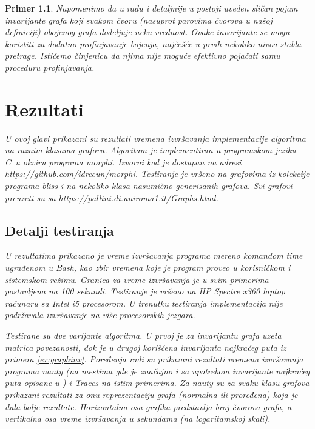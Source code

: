 \documentclass[12pt,oneside]{memoir}
\newtheorem{example}{Primer}
\theoremstyle{definition}
\def\CC{{C\nolinebreak[4]\hspace{-.05em}\raisebox{.4ex}{\tiny\bf ++}}}
\begin{document}
\begin{example}
   Napomenimo da u radu \cite{McKay} i detaljnije u \cite{nug} postoji uveden
   sličan pojam invarijante grafa koji svakom čvoru (nasuprot parovima čvorova
   u našoj definiciji) obojenog grafa dodeljuje neku vrednost. Ovake
   invarijante se mogu koristiti za dodatno profinjavanje bojenja, najčešće u
   prvih nekoliko nivoa stabla pretrage. Ističemo činjenicu da njima nije
   moguće efektivno pojačati samu proceduru profinjavanja.

\chapter{Rezultati}

  U ovoj glavi prikazani su rezultati vremena izvršavanja implementacije
  algoritma na raznim klasama grafova. Algoritam je implementiran u programskom
  jeziku \CC\ u okviru programa \emph{morphi}. Izvorni kod je dostupan na
  adresi \url{https://github.com/idrecun/morphi}.  Testiranje je vršeno na
  grafovima iz kolekcije programa \emph{bliss} i na nekoliko klasa
  nasumično generisanih grafova. Svi grafovi preuzeti su sa
  \url{https://pallini.di.uniroma1.it/Graphs.html}.

  \section{Detalji testiranja}

	U rezultatima prikazano je vreme izvršavanja programa mereno komandom
	\emph{time} ugrađenom u \emph{Bash}, kao zbir vremena koje je program
	proveo u korisničkom i sistemskom režimu. Granica za vreme izvršavanja je u
	svim primerima postavljena na 100 sekundi. Testiranje je vršeno na HP
	Spectre x360 laptop računaru sa Intel i5 procesorom. U trenutku testiranja
	implementacija nije podržavala izvršavanje na više procesorskih jezgara.

	Testirane su dve varijante algoritma. U prvoj je za invarijantu grafa uzeta
	matrica povezanosti, dok je u drugoj korišćena invarijanta najkraćeg puta
	iz primera \ref{ex:graphinv}. Poređenja radi su prikazani rezultati vremena
	izvršavanja programa \emph{nauty} (na mestima gde je značajno i sa
	upotrebom invarijante najkraćeg puta opisane u \cite{nug}) i \emph{Traces}
	na istim primerima. Za \emph{nauty} su za svaku klasu grafova prikazani
	rezultati za onu reprezentaciju grafa (normalna ili proređena) koja je dala
	bolje rezultate. Horizontalna osa grafika predstavlja broj čvorova grafa, a
	vertikalna osa vreme izvršavanja u sekundama (na logaritamskoj skali).


\end{example}
\end{document}

